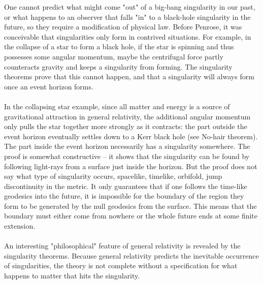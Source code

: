  One cannot predict what might come "out" of a big-bang singularity in our past, or what happens to an observer that falls "in" to a black-hole singularity in the future, so they require a modification of physical law. Before Penrose, it was conceivable that singularities only form in contrived situations. For example, in the collapse of a star to form a black hole, if the star is spinning and thus possesses some angular momentum, maybe the centrifugal force partly counteracts gravity and keeps a singularity from forming. The singularity theorems prove that this cannot happen, and that a singularity will always form once an event horizon forms.
 \\
 \\
 In the collapsing star example, since all matter and energy is a source of gravitational attraction in general relativity, the additional angular momentum only pulls the star together more strongly as it contracts: the part outside the event horizon eventually settles down to a Kerr black hole (see No-hair theorem). The part inside the event horizon necessarily has a singularity somewhere. The proof is somewhat constructive – it shows that the singularity can be found by following light-rays from a surface just inside the horizon. But the proof does not say what type of singularity occurs, spacelike, timelike, orbifold, jump discontinuity in the metric. It only guarantees that if one follows the time-like geodesics into the future, it is impossible for the boundary of the region they form to be generated by the null geodesics from the surface. This means that the boundary must either come from nowhere or the whole future ends at some finite extension.\\
 \\
 
 An interesting "philosophical" feature of general relativity is revealed by the singularity theorems. Because general relativity predicts the inevitable occurrence of singularities, the theory is not complete without a specification for what happens to matter that hits the singularity. 
 
 
 
 
 
 
 
 
 
 
 
 
 
 
 
 
 
 
 
 
 
